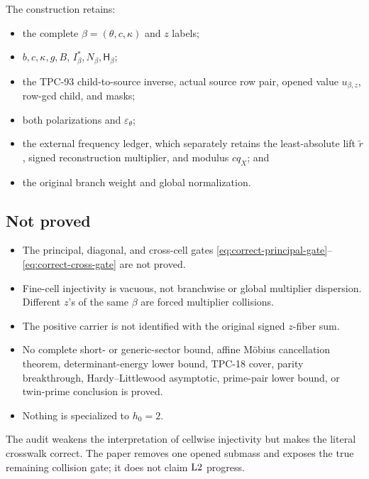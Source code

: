 The construction retains:
\begin{itemize}[leftmargin=2em]
\item the complete \(\beta=(\theta,c,\kappa)\) and \(z\) labels;
\item \(b,c,\kappa,g,B\), \(I_\beta^\ast,N_\beta,\mathsf H_\beta\);
\item the TPC-93 child-to-source inverse, actual source row pair,
  opened value \(u_{\beta,z}\), row-gcd child, and masks;
\item both polarizations and \(\varepsilon_\theta\);
\item the external frequency ledger, which separately retains the
  least-absolute lift \(\widetilde r\), signed reconstruction
  multiplier, and modulus \(cq_X\); and
\item the original branch weight and global normalization.
\end{itemize}

\subsection*{Not proved}

\begin{itemize}[leftmargin=2em]
\item The principal, diagonal, and cross-cell gates
  \eqref{eq:correct-principal-gate}--\eqref{eq:correct-cross-gate}
  are not proved.
\item Fine-cell injectivity is vacuous, not branchwise or global
  multiplier dispersion.  Different \(z\)'s of the same \(\beta\)
  are forced multiplier collisions.
\item The positive carrier is not identified with the original
  signed \(z\)-fiber sum.
\item No complete short- or generic-sector bound, affine M\"obius
  cancellation theorem, determinant-energy lower bound, TPC-18
  cover, parity breakthrough, Hardy--Littlewood asymptotic,
  prime-pair lower bound, or twin-prime conclusion is proved.
\item Nothing is specialized to \(h_0=2\).
\end{itemize}

The audit weakens the interpretation of cellwise injectivity but
makes the literal crosswalk correct.  The paper removes one opened
submass and exposes the true remaining collision gate; it does not
claim \(\mathrm{L2}\) progress.
